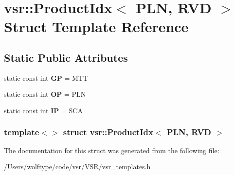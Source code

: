 \hypertarget{structvsr_1_1_product_idx_3_01_p_l_n_00_01_r_v_d_01_4}{\section{vsr\-:\-:Product\-Idx$<$ P\-L\-N, R\-V\-D $>$ Struct Template Reference}
\label{structvsr_1_1_product_idx_3_01_p_l_n_00_01_r_v_d_01_4}
}
\subsection*{Static Public Attributes}
\begin{DoxyCompactItemize}
\item 
\hypertarget{structvsr_1_1_product_idx_3_01_p_l_n_00_01_r_v_d_01_4_a5b1d9bad264215bdc74e9bdbad5bdd87}{static const int {\bfseries G\-P} = M\-T\-T}\label{structvsr_1_1_product_idx_3_01_p_l_n_00_01_r_v_d_01_4_a5b1d9bad264215bdc74e9bdbad5bdd87}

\item 
\hypertarget{structvsr_1_1_product_idx_3_01_p_l_n_00_01_r_v_d_01_4_ab3023fde40992a00563ed87ce4068b12}{static const int {\bfseries O\-P} = P\-L\-N}\label{structvsr_1_1_product_idx_3_01_p_l_n_00_01_r_v_d_01_4_ab3023fde40992a00563ed87ce4068b12}

\item 
\hypertarget{structvsr_1_1_product_idx_3_01_p_l_n_00_01_r_v_d_01_4_a8878f15756f89fdced94b0d01c1e77e9}{static const int {\bfseries I\-P} = S\-C\-A}\label{structvsr_1_1_product_idx_3_01_p_l_n_00_01_r_v_d_01_4_a8878f15756f89fdced94b0d01c1e77e9}

\end{DoxyCompactItemize}
\subsubsection*{template$<$$>$ struct vsr\-::\-Product\-Idx$<$ P\-L\-N, R\-V\-D $>$}



The documentation for this struct was generated from the following file\-:\begin{DoxyCompactItemize}
\item 
/\-Users/wolftype/code/vsr/\-V\-S\-R/vsr\-\_\-templates.\-h\end{DoxyCompactItemize}
